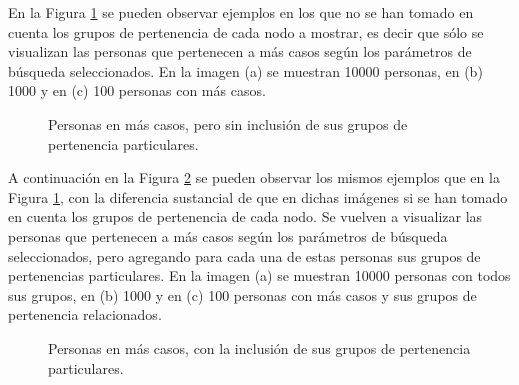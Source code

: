 En la Figura \ref{fig:grafosSolos} se pueden observar ejemplos en los que no se han tomado en cuenta los grupos de pertenencia de cada nodo a mostrar, es decir que sólo se visualizan las personas que pertenecen a más casos según los parámetros de búsqueda seleccionados. En la imagen (a) se muestran 10000 personas, en (b) 1000 y en (c) 100 personas con más casos.

\begin{figure}[htbp]
	\centering
	\centering
	\caption{ Personas en más casos, pero sin inclusión de sus grupos de pertenencia particulares.}
	\label{fig:grafosSolos}
\end{figure}

A continuación en la Figura \ref{fig:grafosCompletos} se pueden observar los mismos ejemplos que en la Figura \ref{fig:grafosSolos}, con la diferencia sustancial de que en dichas imágenes si se han tomado en cuenta los grupos de pertenencia de cada nodo. Se vuelven a visualizar las personas que pertenecen a más casos según los parámetros de búsqueda seleccionados, pero agregando para cada una de estas personas sus grupos de pertenencias particulares. En la imagen (a) se muestran 10000 personas con todos sus grupos, en (b) 1000 y en (c) 100 personas con más casos y sus grupos de pertenencia relacionados.

\begin{figure}[htbp]
	\centering
	\centering
	\caption{ Personas en más casos, con la inclusión de sus grupos de pertenencia particulares.}
	\label{fig:grafosCompletos}
\end{figure}

